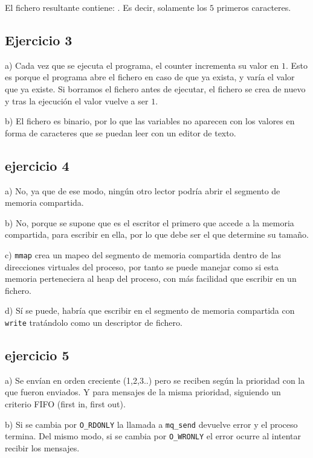 \documentclass{article}
\begin{document}
El fichero resultante contiene: . Es decir, solamente los $5$ primeros caracteres.


\subsection*{Ejercicio 3}

a) Cada vez que se ejecuta el programa, el counter incrementa su valor en $1$. Esto es porque el programa abre el fichero en caso de que ya exista, y varía el valor que ya existe. Si borramos el fichero antes de ejecutar, el fichero se crea de nuevo y tras la ejecución el valor vuelve a ser $1$.

b) El fichero es binario, por lo que las variables no aparecen con los valores en forma de caracteres que se puedan leer con un editor de texto.


\subsection*{ejercicio 4}

a) No, ya que de ese modo, ningún otro lector podría abrir el segmento de memoria compartida.

b) No, porque se supone que es el escritor el primero que accede a la memoria compartida, para escribir en ella, por lo que debe ser el que determine su tamaño.

c) \texttt{mmap} crea un mapeo del segmento de memoria compartida dentro de las direcciones virtuales del proceso, por tanto se puede manejar como si esta memoria perteneciera al heap del proceso, con más facilidad que escribir en un fichero.

d) Sí se puede, habría que escribir en el segmento de memoria compartida con \texttt{write} tratándolo como un descriptor de fichero.

\subsection*{ejercicio 5}

a) Se envían en orden creciente (1,2,3..) pero se reciben según la prioridad con la que fueron enviados. Y para mensajes de la misma prioridad, siguiendo un criterio FIFO (first in, first out).

b) Si se cambia por \texttt{O\_RDONLY} la llamada a \texttt{mq\_send} devuelve error y el proceso termina. Del mismo modo, si se cambia por \texttt{O\_WRONLY} el error ocurre al intentar recibir los mensajes.
\end{document}
